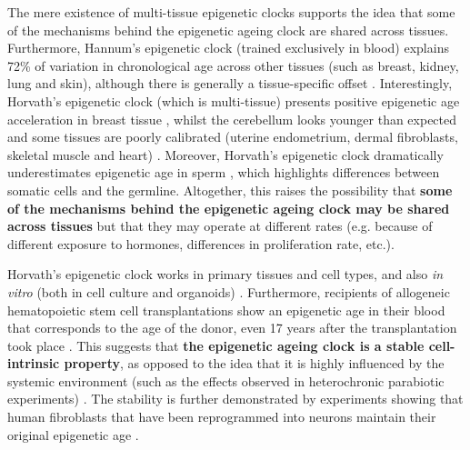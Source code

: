 \bigskip

The mere existence of multi-tissue epigenetic clocks supports the idea that some of the mechanisms behind the epigenetic ageing clock are shared across tissues. Furthermore, Hannum's epigenetic clock (trained exclusively in blood) explains 72\% of variation in chronological age across other tissues (such as breast, kidney, lung and skin), although there is generally a tissue-specific offset \citep{Hannum2013}. Interestingly, Horvath's epigenetic clock (which is multi-tissue) presents positive epigenetic age acceleration in breast tissue \citep{Sehl2017}, whilst the cerebellum looks younger than expected \citep{Horvath2015} and some tissues are poorly calibrated (uterine endometrium, dermal fibroblasts, skeletal muscle and heart) \citep{Horvath2013}. Moreover, Horvath's epigenetic clock dramatically underestimates epigenetic age in sperm \citep{Horvath2013}, which highlights differences between somatic cells and the germline. Altogether, this raises the possibility that \textbf{some of the mechanisms behind the epigenetic ageing clock may be shared across tissues} but that they may operate at different rates (e.g. because of different exposure to hormones, differences in proliferation rate, etc.). 

\bigskip

Horvath's epigenetic clock works in primary tissues and cell types, and also \textit{in vitro} (both in cell culture and organoids) \citep{Horvath2013,Hoshino2019}. Furthermore, recipients of allogeneic hematopoietic stem cell transplantations show an epigenetic age in their blood that corresponds to the age of the donor, even 17 years after the transplantation took place \citep{Soraas2019}. This suggests that \textbf{the epigenetic ageing clock is a stable cell-intrinsic property}, as opposed to the idea that it is highly influenced by the systemic environment (such as the effects observed in heterochronic parabiotic experiments) \citep{Conboy2005}. The stability is further demonstrated by experiments showing that human fibroblasts that have been reprogrammed into neurons maintain their original epigenetic age \citep{Huh2016}.     

\bigskip

